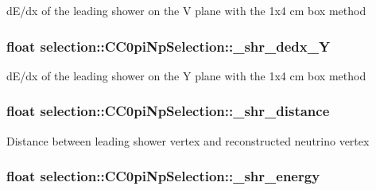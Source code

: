 d\-E/dx of the leading shower on the V plane with the 1x4 cm box method \hypertarget{classselection_1_1CC0piNpSelection_a1af96c31bd3afe4b111f429927bbff1c}{
\subsubsection[{\-\_\-shr\-\_\-dedx\-\_\-\-Y}]{\setlength{\rightskip}{0pt plus 5cm}float selection\-::\-C\-C0pi\-Np\-Selection\-::\-\_\-shr\-\_\-dedx\-\_\-\-Y\hspace{0.3cm}{\ttfamily [private]}}}\label{classselection_1_1CC0piNpSelection_a1af96c31bd3afe4b111f429927bbff1c}
d\-E/dx of the leading shower on the Y plane with the 1x4 cm box method \hypertarget{classselection_1_1CC0piNpSelection_a20705dc212e16009a0ce4ace27d54af7}{
\subsubsection[{\-\_\-shr\-\_\-distance}]{\setlength{\rightskip}{0pt plus 5cm}float selection\-::\-C\-C0pi\-Np\-Selection\-::\-\_\-shr\-\_\-distance\hspace{0.3cm}{\ttfamily [private]}}}\label{classselection_1_1CC0piNpSelection_a20705dc212e16009a0ce4ace27d54af7}
Distance between leading shower vertex and reconstructed neutrino vertex \hypertarget{classselection_1_1CC0piNpSelection_abf854f061d0476dc08ae8b3d71e7a86d}{
\subsubsection[{\-\_\-shr\-\_\-energy}]{\setlength{\rightskip}{0pt plus 5cm}float selection\-::\-C\-C0pi\-Np\-Selection\-::\-\_\-shr\-\_\-energy\hspace{0.3cm}{\ttfamily [private]}}}\label{classselection_1_1CC0piNpSelection_abf854f061d0476dc08ae8b3d71e7a86d}
